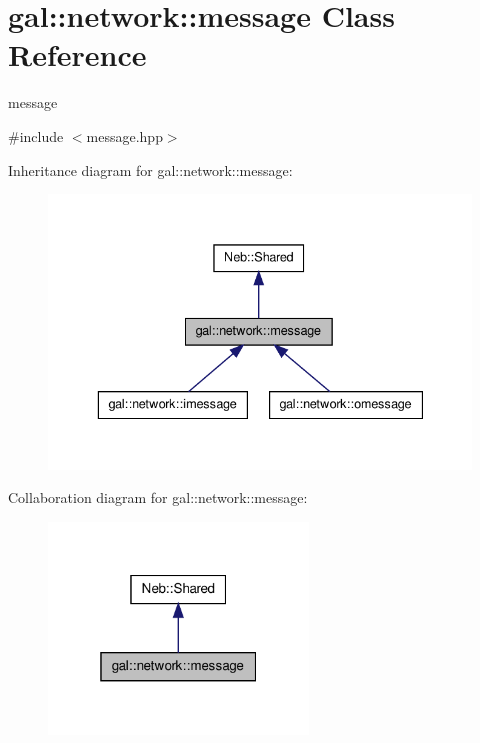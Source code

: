 \hypertarget{classgal_1_1network_1_1message}{\section{gal\-:\-:network\-:\-:message \-Class \-Reference}
\label{classgal_1_1network_1_1message}
}


message  




{\ttfamily \#include $<$message.\-hpp$>$}



\-Inheritance diagram for gal\-:\-:network\-:\-:message\-:\nopagebreak
\begin{figure}[H]
\begin{center}
\leavevmode
\includegraphics[width=336pt]{classgal_1_1network_1_1message__inherit__graph}
\end{center}
\end{figure}


\-Collaboration diagram for gal\-:\-:network\-:\-:message\-:\nopagebreak
\begin{figure}[H]
\begin{center}
\leavevmode
\includegraphics[width=196pt]{classgal_1_1network_1_1message__coll__graph}
\end{center}
\end{figure}
